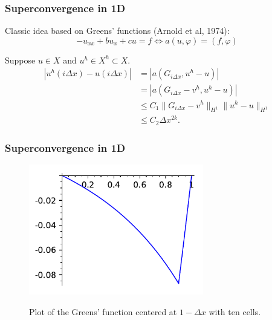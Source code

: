 \documentclass[8pt]{beamer}
\begin{document}
\begin{frame}
    \frametitle{Superconvergence in 1D}
    Classic idea based on Greens' functions (Arnold et al, 1974):
    \begin{equation*}
        -u_{xx} + b u_x + c u = f \Leftrightarrow
        a(u, \varphi) = (f, \varphi)
    \end{equation*}
    \pause

    Suppose \(u \in X\) and \(u^h \in X^h \subset X\).
    \begin{align*}
        |u^h(i \Delta x) - u(i \Delta x)|
        &= |a(G_{i\Delta x}, u^h - u)|                                        \\
        &= |a(G_{i\Delta x} - v^h, u^h - u)|                                  \\
        &\leq C_1 \|G_{i\Delta x} - v^h\|_{H^1} \|u^h - u\|_{H^1}             \\
        &\leq C_2 \Delta x^{2 k}.
    \end{align*}
\end{frame}

\begin{frame}
    \frametitle{Superconvergence in 1D}
    \begin{figure}
        \centering

        \includegraphics[width=3in]{greens-cdr.pdf}

        Plot of the Greens' function centered at \(1 - \Delta x\) with ten cells.
    \end{figure}
\end{frame}
\end{document}

